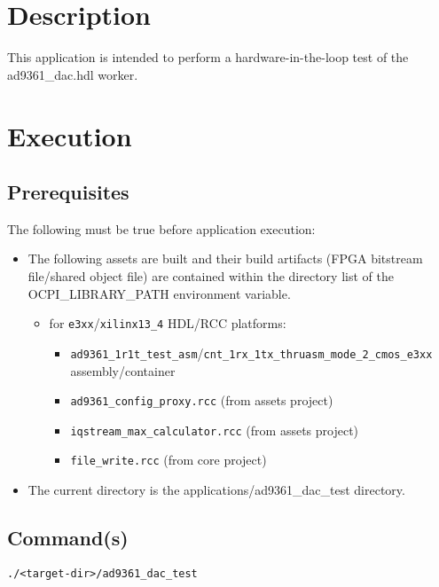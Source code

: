 \section{Description}
This application is intended to perform a hardware-in-the-loop test of the ad9361\_dac.hdl worker.

\section{Execution}
\subsection{Prerequisites}
The following must be true before application execution:
\begin{itemize}
  \item The following assets are built and their build artifacts (FPGA bitstream file/shared object file) are contained within the directory list of the OCPI\_LIBRARY\_PATH environment variable.
  \begin{itemize}
    \item for \verb+e3xx+/\verb+xilinx13_4+ HDL/RCC platforms:
    \begin{itemize}
      \item \verb+ad9361_1r1t_test_asm+/\verb+cnt_1rx_1tx_thruasm_mode_2_cmos_e3xx+ assembly/container
      \item \verb+ad9361_config_proxy.rcc+ (from assets project)
      \item \verb+iqstream_max_calculator.rcc+ (from assets project)
      \item \verb+file_write.rcc+ (from core project)
    \end{itemize}
  \end{itemize}
\item The current directory is the applications/ad9361\_dac\_test directory.
\end{itemize}
\subsection{Command(s)}
\begin{lstlisting}
./<target-dir>/ad9361_dac_test
\end{lstlisting}

\pagebreak
